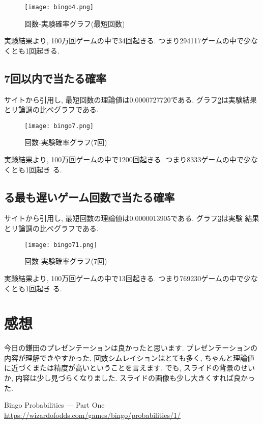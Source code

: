 \documentclass[a4j, titlepage]{jarticle}
\begin{document}
\begin{figure}[h]
    \centering \texttt{[image: bingo4.png]}
    \caption{回数-実験確率グラフ(最短回数)}
    \label{graph:below4}
\end{figure}

実験結果より, 100万回ゲームの中で34回起きる. つまり294117ゲームの中で少なくとも1回起きる. 

\subsection{7回以内で当たる確率}
サイトから引用し, 最短回数の理論値は0.0000727720である\cite{Bingo-確率}. グラフ\ref{graph:below7}は実験結果とリ論調の比べグラフである.

\begin{figure}[h]
    \centering \texttt{[image: bingo7.png]}
    \caption{回数-実験確率グラフ(7回)}
    \label{graph:below7}
\end{figure}

実験結果より, 100万回ゲームの中で1200回起きる. つまり8333ゲームの中で少なくとも1回起き
る. 

\subsection{る最も遅いゲーム回数で当たる確率}
サイトから引用し, 最短回数の理論値は0.0000013905である\cite{Bingo-確率}. グラフ\ref{graph:below71}は実験
結果とリ論調の比べグラフである.

\begin{figure}[h]
    \centering \texttt{[image: bingo71.png]}
    \caption{回数-実験確率グラフ(7回)}
    \label{graph:below71}
\end{figure}

実験結果より, 100万回ゲームの中で13回起きる. つまり769230ゲームの中で少なくとも1回起き
る. 

\pagebreak
\section{感想}
今日の鎌田のプレゼンテーションは良かったと思います. プレゼンテーションの内容が理解できやすかった. 回数シムレイションはとても多く, ちゃんと理論値に近づくまたは精度が高いということを言えます. でも, スライドの背景のせいか, 内容は少し見づらくなりました. スライドの画像も少し大きくすれば良かった. 

\begin{thebibliography}{99}
Bingo Probabilities — Part One \url{https://wizardofodds.com/games/bingo/probabilities/1/}
\end{thebibliography} 
\end{document}
